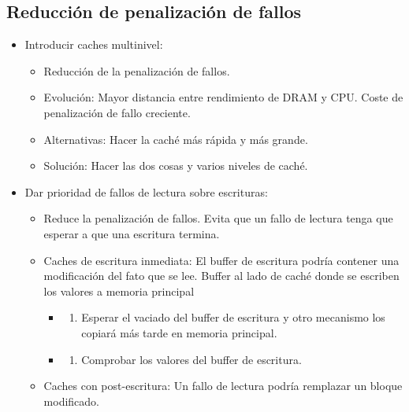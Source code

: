 \documentclass[12pt, twoside, openright]{report} %
\begin{document}
\subsection{Reducción de penalización de fallos}

  \begin{itemize}
  
  \item
    Introducir caches multinivel:

    \begin{itemize}
    
    \item
      Reducción de la penalización de fallos.
    \item
      Evolución: Mayor distancia entre rendimiento de DRAM y CPU. Coste
      de penalización de fallo creciente.
    \item
      Alternativas: Hacer la caché más rápida y más grande.
    \item
      Solución: Hacer las dos cosas y varios niveles de caché.
    \end{itemize}
    \pagebreak
  \item
    Dar prioridad de fallos de lectura sobre escrituras:

    \begin{itemize}
    
    \item
      Reduce la penalización de fallos. Evita que un fallo de lectura
      tenga que esperar a que una escritura termina.
    \item
      Caches de escritura inmediata: El buffer de escritura podría
      contener una modificación del fato que se lee. Buffer al lado de
      caché donde se escriben los valores a memoria principal

      \begin{itemize}
      \item
        \begin{enumerate}
        \def\labelenumi{\alph{enumi})}
        
        \item
          Esperar el vaciado del buffer de escritura y otro mecanismo
          los copiará más tarde en memoria principal.
        \end{enumerate}
      \item
        \begin{enumerate}
        \def\labelenumi{\alph{enumi})}
        \setcounter{enumi}{1}
        
        \item
          Comprobar los valores del buffer de escritura.
        \end{enumerate}
      \end{itemize}
    \item
      Caches con post-escritura: Un fallo de lectura podría remplazar un
      bloque modificado.


\end{itemize}
\end{itemize}
\end{document}
